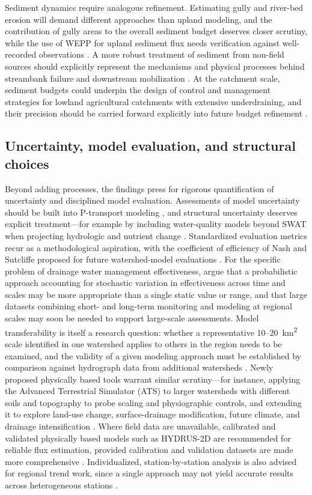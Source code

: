 Sediment dynamics require analogous refinement. Estimating gully and river-bed erosion will demand different approaches than upland modeling, and the contribution of gully areas to the overall sediment budget deserves closer scrutiny, while the use of WEPP for upland sediment flux needs verification against well-recorded observations \parencite{Maalim2013}. A more robust treatment of sediment from non-field sources should explicitly represent the mechanisms and physical processes behind streambank failure and downstream mobilization \parencite{Dalzell2018}. At the catchment scale, sediment budgets could underpin the design of control and management strategies for lowland agricultural catchments with extensive underdraining, and their precision should be carried forward explicitly into future budget refinement \parencite{Walling2002}.

\subsection{Uncertainty, model evaluation, and structural choices}

Beyond adding processes, the findings press for rigorous quantification of uncertainty and disciplined model evaluation. Assessments of model uncertainty should be built into P-transport modeling \parencite{Wang2020b}, and structural uncertainty deserves explicit treatment---for example by including water-quality models beyond SWAT when projecting hydrologic and nutrient change \parencite{Kujawa2020}. Standardized evaluation metrics recur as a methodological aspiration, with the coefficient of efficiency of Nash and Sutcliffe proposed for future watershed-model evaluations \parencite{STONE1995,SAVABI1995}. For the specific problem of drainage water management effectiveness, \textcite{Shedekar2021} argue that a probabilistic approach accounting for stochastic variation in effectiveness across time and scales may be more appropriate than a single static value or range, and that large datasets combining short- and long-term monitoring and modeling at regional scales may soon be needed to support large-scale assessments. Model transferability is itself a research question: whether a representative 10--20~km\textsuperscript{2} scale identified in one watershed applies to others in the region needs to be examined, and the validity of a given modeling approach must be established by comparison against hydrograph data from additional watersheds \parencite{Basu2010}. Newly proposed physically based tools warrant similar scrutiny---for instance, applying the Advanced Terrestrial Simulator (ATS) to larger watersheds with different soils and topography to probe scaling and physiographic controls, and extending it to explore land-use change, surface-drainage modification, future climate, and drainage intensification \parencite{Rathore2025}. Where field data are unavailable, calibrated and validated physically based models such as HYDRUS-2D are recommended for reliable flux estimation, provided calibration and validation datasets are made more comprehensive \parencite{Naderi2025}. Individualized, station-by-station analysis is also advised for regional trend work, since a single approach may not yield accurate results across heterogeneous stations \parencite{Kumar2009}.

